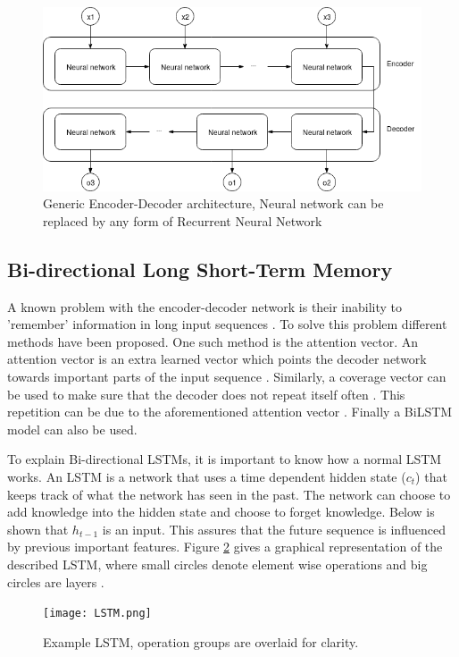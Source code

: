 \documentclass[a4paper,10pt]{article}
\theoremstyle{plain}
\theoremstyle{definition}
\begin{document}
\begin{multicols*}{2}
\begin{figure}[H]
    \centering
    \includegraphics[width=\linewidth]{BasicEncoderDecoder.png}
    \caption{Generic Encoder-Decoder architecture, Neural network can be replaced by any form of Recurrent Neural Network}
    \label{fig:basic enc}
\end{figure}

\subsection{Bi-directional Long Short-Term Memory}
A known problem with the encoder-decoder network is their inability to 'remember' information in long input sequences \cite{attentionisallyouneed}. To solve this problem different methods have been proposed. One such method is the attention vector. An attention vector is an extra learned vector which points the decoder network towards important parts of the input sequence \cite{attentionisallyouneed}. Similarly, a coverage vector can be used to make sure that the decoder does not repeat itself often \cite{see2017get}. This repetition can be due to the aforementioned attention vector \cite{context}. Finally a BiLSTM model can also be used. 

To explain Bi-directional LSTMs, it is important to know how a normal LSTM works. An LSTM is a network that uses a time dependent hidden state ($c_t$) that keeps track of what the network has seen in the past. The network can choose to add knowledge into the hidden state and choose to forget knowledge. Below is shown that $h_{t-1}$ is an input. This assures that the future sequence is influenced by previous important features. Figure \ref{fig:LSTM} gives a graphical representation of the described LSTM, where small circles denote element wise operations and big circles are layers \cite{hochreiter1997lstm}.

\begin{figure}[H]
    \centering
    \texttt{[image: LSTM.png]}
    \caption{Example LSTM, operation groups are overlaid for clarity.}
    \label{fig:LSTM}
\end{figure}


\end{multicols*}
\end{document}
